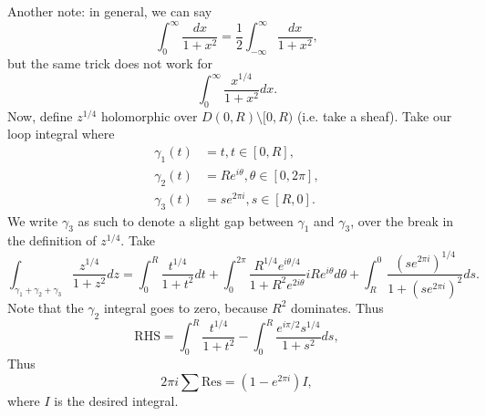 \documentclass{artikel3}
\numberwithin{equation}{enumi}
\begin{document}
Another note: in general, we can say \[
	\int_{0}^{\infty}\frac{dx}{1+x^2}=\frac{1}{2}\int_{-\infty}^{\infty}\frac{dx}{1+x^2},
\] but the same trick does not work for \[
	\int_{0}^{\infty}\frac{x^{1/4}}{1+x^2}dx.
\] Now, define $z^{1/4}$ holomorphic over $D(0,R)\setminus[0,R)$
(i.e. take a sheaf).  Take our loop integral where
\begin{align*}
	\gamma_1(t)&=t,t\in [0,R],\\
	\gamma_2(t)&=Re^{i\theta},\theta\in[0,2\pi],\\
	\gamma_3(t)&=se^{2\pi i},s\in [R,0].
\end{align*}
We write $\gamma_3$ as such to denote a slight gap between $\gamma_1$ and $\gamma_3$,
over the break in the definition of $z^{1/4}$.
Take \[
	\int_{\gamma_1+\gamma_2+\gamma_3}\frac{z^{1/4}}{1+z^2}dz
	= \int_{0}^{R}\frac{t^{1/4}}{1+t^2}dt+\int_{0}^{2\pi}\frac{R^{1/4}e^{i\theta/4}}{1+R^2e^{2i\theta}}iRe^{i\theta}d\theta
	+\int_{R}^{0}\frac{(se^{2\pi i})^{1/4}}{1+(se^{2\pi i})^2}ds.
\] Note that the $\gamma_2$ integral goes to zero, because $R^2$ dominates.
Thus \[
	\mathrm{RHS}=\int_{0}^R \frac{t^{1/4}}{1+t^2}-\int_{0}^{R}\frac{e^{i\pi/2}s^{1/4}}{1+s^2}ds,
\] Thus \[
	2\pi i\sum\mathrm{Res}=(1-e^{2\pi i})I,
\] where $I$ is the desired integral.
\label{lastpage}
\end{document}

